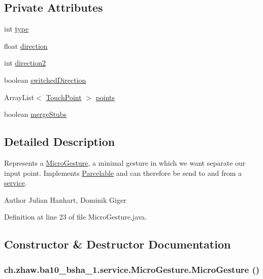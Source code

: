\subsection*{Private Attributes}
\begin{DoxyCompactItemize}
\item 
int \hyperlink{classch_1_1zhaw_1_1ba10__bsha__1_1_1service_1_1MicroGesture_ac1ee8b835a0b20d0e3535682eb0d2741}{type}
\item 
float \hyperlink{classch_1_1zhaw_1_1ba10__bsha__1_1_1service_1_1MicroGesture_a99f2fb0a7f8e2667b5fb8043dde76ff8}{direction}
\item 
int \hyperlink{classch_1_1zhaw_1_1ba10__bsha__1_1_1service_1_1MicroGesture_a26b7878eab20cb414669e324e6baf64e}{direction2}
\item 
boolean \hyperlink{classch_1_1zhaw_1_1ba10__bsha__1_1_1service_1_1MicroGesture_aaddd90c10ceefbedf0dc527d93989b84}{switchedDirection}
\item 
ArrayList$<$ \hyperlink{classch_1_1zhaw_1_1ba10__bsha__1_1_1TouchPoint}{TouchPoint} $>$ \hyperlink{classch_1_1zhaw_1_1ba10__bsha__1_1_1service_1_1MicroGesture_a3eb0c61e8503400680d21d305ca58356}{points}
\item 
boolean \hyperlink{classch_1_1zhaw_1_1ba10__bsha__1_1_1service_1_1MicroGesture_ad6fe6b70a61b144c8868ff32478d7d5a}{mergeStubs}
\end{DoxyCompactItemize}


\subsection{Detailed Description}
Represents a \hyperlink{classch_1_1zhaw_1_1ba10__bsha__1_1_1service_1_1MicroGesture}{MicroGesture}, a minimal gesture in which we want separate our input point. Implements \hyperlink{}{Parcelable} and can therefore be send to and from a \hyperlink{namespacech_1_1zhaw_1_1ba10__bsha__1_1_1service}{service}.

\begin{DoxyAuthor}{Author}
Julian Hanhart, Dominik Giger 
\end{DoxyAuthor}


Definition at line 23 of file MicroGesture.java.

\subsection{Constructor \& Destructor Documentation}
\hypertarget{classch_1_1zhaw_1_1ba10__bsha__1_1_1service_1_1MicroGesture_a751ff230434387aa91538c649520745b}{
\subsubsection[{MicroGesture}]{\setlength{\rightskip}{0pt plus 5cm}ch.zhaw.ba10\_\-bsha\_\-1.service.MicroGesture.MicroGesture ()}}
\label{classch_1_1zhaw_1_1ba10__bsha__1_1_1service_1_1MicroGesture_a751ff230434387aa91538c649520745b}


